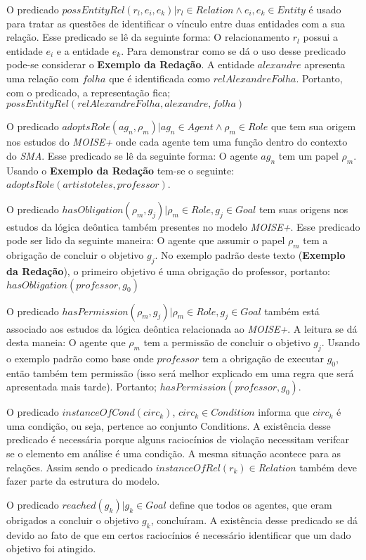 O predicado $possEntityRel(r_l,e_i,e_k) | r_l \in Relation \wedge  e_i, e_k \in Entity$ é usado para tratar as questões de identificar o vínculo entre duas entidades com a sua relação. Esse predicado se lê da seguinte forma: O relacionamento $r_l$ possui a entidade $e_i$ e a entidade $e_k$. Para demonstrar como se dá o uso desse predicado pode-se considerar o \textbf{Exemplo da Redação}. A entidade $alexandre$ apresenta uma relação com $folha$ que é identificada como $relAlexandreFolha$. Portanto, com o predicado, a representação fica; $possEntityRel(relAlexandreFolha,alexandre,folha)$

O predicado $adoptsRole(ag_n,\rho_m) | ag_n \in Agent \wedge \rho_m \in Role$ que tem sua origem nos estudos do \textit{MOISE+} onde cada agente tem uma função dentro do contexto do \textit{SMA}. Esse predicado se lê da seguinte forma: O agente $ag_n$ tem um papel $\rho_m$. Usando o \textbf{Exemplo da Redação} tem-se o seguinte: $adoptsRole(artistoteles,professor)$. 

O predicado $hasObligation(\rho_m,g_j) | \rho_m \in Role, g_j \in Goal $ tem suas origens nos estudos da lógica deôntica também presentes no modelo \textit{MOISE+}. Esse predicado pode ser lido da seguinte maneira: O agente que assumir o papel $\rho_m$ tem a obrigação de concluir o objetivo $g_j$. No exemplo padrão deste texto (\textbf{Exemplo da Redação}), o primeiro objetivo é uma obrigação do professor, portanto: $hasObligation(professor,g_0)$

O predicado $hasPermission(\rho_m, g_j) | \rho_m \in Role, g_j \in Goal $ também está associado aos estudos da lógica deôntica relacionada ao \textit{MOISE+}. A leitura se dá desta maneia: O agente que $\rho_m$ tem a permissão de concluir o objetivo $g_j$. Usando o exemplo padrão como base onde $professor$ tem a obrigação de executar $g_0$, então também tem permissão (isso será melhor explicado em uma regra que será apresentada mais tarde). Portanto; $hasPermission(professor,g_0)$.  

O predicado $instanceOfCond(circ_k)$, $circ_k \in Condition$ informa que $circ_k$ é uma condição, ou seja, pertence ao conjunto Conditions. A existência desse predicado é necessária porque alguns raciocínios de violação necessitam verifcar se o elemento em análise é uma condição. A mesma situação acontece para as relações. Assim sendo o predicado $ instanceOfRel(r_k) \in Relation $ também deve fazer parte da estrutura do modelo.

O predicado $reached(g_k) | g_k \in Goal $ define que todos os agentes, que eram obrigados a concluir o objetivo $g_k$, concluíram. A existência desse predicado se dá devido ao fato de que em certos raciocínios é necessário identificar que um dado objetivo foi atingido. 

